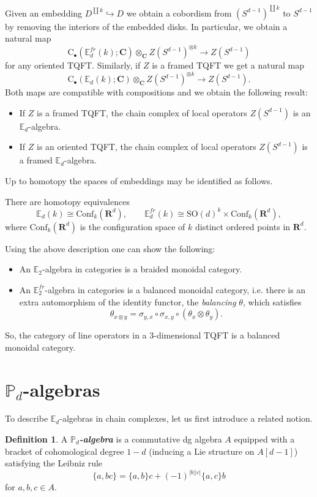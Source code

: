 \documentclass[10pt]{amsart}
\newcommand{\C}{\mathbf{C}}
\newcommand{\rC}{\mathrm{C}}
\newcommand{\bE}{\mathbb{E}}
\newcommand{\bP}{\mathbb{P}}
\newcommand{\R}{\mathbf{R}}
\newcommand{\Conf}{\mathrm{Conf}}
\newcommand{\SO}{\mathrm{SO}}
\newcommand{\defterm}[1]{\textbf{\emph{#1}}}
\theoremstyle{definition}
\theoremstyle{definition}
\newtheorem{defn}[thm]{Definition}
\begin{document}
Given an embedding $D^{\coprod k}\hookrightarrow D$ we obtain a cobordism from $(S^{d-1})^{\coprod k}$ to $S^{d-1}$ by removing the interiors of the embedded disks. In particular, we obtain a natural map
\[\rC_\bullet(\bE^{fr}_d(k); \C)\otimes_\C Z(S^{d-1})^{\otimes k}\longrightarrow Z(S^{d-1})\]
for any oriented TQFT. Similarly, if $Z$ is a framed TQFT we get a natural map
\[\rC_\bullet(\bE_d(k); \C)\otimes_\C Z(S^{d-1})^{\otimes k}\longrightarrow Z(S^{d-1}).\]
Both maps are compatible with compositions and we obtain the following result:
\begin{itemize}
\item If $Z$ is a framed TQFT, the chain complex of local operators $Z(S^{d-1})$ is an $\bE_d$-algebra.
\item If $Z$ is an oriented TQFT, the chain complex of local operators $Z(S^{d-1})$ is a framed $\bE_d$-algebra.
\end{itemize}

Up to homotopy the spaces of embeddings may be identified as follows.

\begin{prop}
There are homotopy equivalences
\[\bE_d(k)\cong \Conf_k(\R^d),\qquad \bE^{fr}_d(k)\cong \SO(d)^k\times \Conf_k(\R^d),\]
where $\Conf_k(\R^d)$ is the configuration space of $k$ distinct ordered points in $\R^d$.
\end{prop}

Using the above description one can show the following:
\begin{itemize}
\item An $\bE_2$-algebra in categories is a braided monoidal category.
\item An $\bE^{fr}_2$-algebra in categories is a balanced monoidal category, i.e. there is an extra automorphism of the identity functor, the \emph{balancing} $\theta$, which satisfies
\[\theta_{x\otimes y} = \sigma_{y, x}\circ \sigma_{x, y}\circ (\theta_x\otimes \theta_y).\]
\end{itemize}

So, the category of line operators in a 3-dimensional TQFT is a balanced monoidal category.

\section{$\bP_d$-algebras}

To describe $\bE_d$-algebras in chain complexes, let us first introduce a related notion.

\begin{defn}
A \defterm{$\bP_d$-algebra} is a commutative dg algebra $A$ equipped with a bracket of cohomological degree $1-d$ (inducing a Lie structure on $A[d-1]$) satisfying the Leibniz rule
\[\{a, bc\} = \{a, b\}c + (-1)^{|b||c|}\{a, c\}b\]
for $a,b,c\in A$.
\end{defn}
\end{document}
